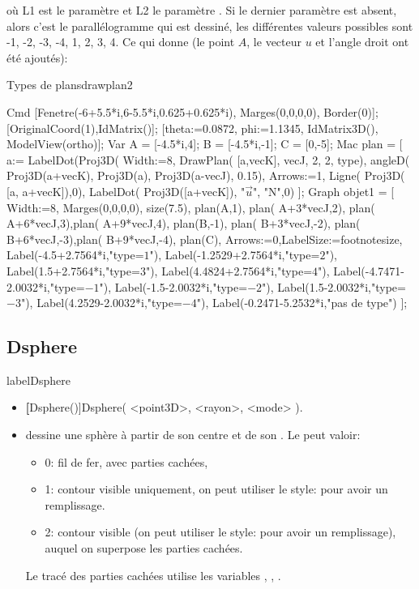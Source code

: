 où L1 est le paramètre  et L2 le paramètre . Si le dernier paramètre  est absent, alors c'est le parallélogramme qui est dessiné, les différentes valeurs possibles sont -1, -2, -3, -4, 1, 2, 3, 4. Ce qui donne (le point $A$, le vecteur $u$ et l'angle droit ont été ajoutés):

\begin{demo}{Types de plans}{drawplan2}
\begin{texgraph}[name=drawplan2,file]
Cmd [Fenetre(-6+5.5*i,6-5.5*i,0.625+0.625*i), Marges(0,0,0,0), Border(0)];
  [OriginalCoord(1),IdMatrix()];
  [theta:=0.0872, phi:=1.1345, IdMatrix3D(), ModelView(ortho)];
Var
  A = [-4.5*i,4];
  B = [-4.5*i,-1];
  C = [0,-5];
Mac
  plan = [ a:=%
   LabelDot(Proj3D(%
   Width:=8,
   DrawPlan( [a,vecK], vecJ, 2, 2, type),
   angleD( Proj3D(a+vecK), Proj3D(a), Proj3D(a-vecJ), 0.15),
   Arrows:=1,
   Ligne( Proj3D( [a, a+vecK]),0),
   LabelDot( Proj3D([a+vecK]), "$\vec{u}$", "N",0)
  ];
Graph objet1 = [
  Width:=8, Marges(0,0,0,0), size(7.5),
  plan(A,1), plan( A+3*vecJ,2), plan( A+6*vecJ,3),plan( A+9*vecJ,4),
  plan(B,-1), plan( B+3*vecJ,-2), plan( B+6*vecJ,-3),plan( B+9*vecJ,-4),
  plan(C),
  Arrows:=0,LabelSize:=footnotesize,
  Label(-4.5+2.7564*i,"type=$1$"),
  Label(-1.2529+2.7564*i,"type=$2$"),
  Label(1.5+2.7564*i,"type=$3$"),
  Label(4.4824+2.7564*i,"type=$4$"),
  Label(-4.7471-2.0032*i,"type=$-1$"),
  Label(-1.5-2.0032*i,"type=$-2$"),
  Label(1.5-2.0032*i,"type=$-3$"),
  Label(4.2529-2.0032*i,"type=$-4$"),
  Label(-0.2471-5.2532*i,"pas de type")
  ];
\end{texgraph}
\end{demo}

\subsection{Dsphere}label{Dsphere}
\begin{itemize}
 \item \util \textbf[Dsphere()]{Dsphere( <point3D>, <rayon>, <mode> )}.
 \item \desc dessine une sphère à partir de son centre  et de son . Le  peut valoir:

  \begin{itemize}
  \item 0: fil de fer, avec parties cachées,
  \item 1: contour visible uniquement, on peut utiliser le style:  pour avoir un remplissage.
  \item 2: contour visible (on peut utiliser le style:  pour avoir un remplissage), auquel on superpose les parties cachées.
  \end{itemize}

Le tracé des parties cachées utilise les variables , , .
\end{itemize}

